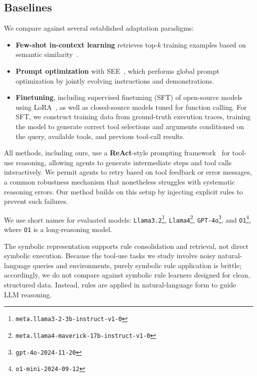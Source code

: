 \subsection{Baselines}


We compare \shortname against several established adaptation paradigms:
\begin{itemize}
    \item \textbf{Few-shot in-context learning} retrieves top-$k$ training examples based on
    semantic similarity~\citep{yizhe2021fewshot}.
    \item \textbf{Prompt optimization} with SEE~\citep{cui2025see}, which performs global prompt
    optimization by jointly evolving instructions and demonstrations.
    \item \textbf{Finetuning}, including supervised finetuning (SFT) of open-source models using
    LoRA~\citep{hu2021lora}, as well as closed-source models tuned for function calling.
    For SFT, we construct training data from ground-truth execution traces, training the model
    to generate correct tool selections and arguments conditioned on the query, available tools,
    and previous tool-call results.
\end{itemize}


All methods, including ours, use a \textbf{ReAct}-style prompting framework~\citep{yao2023react} for tool-use
reasoning, allowing agents to generate intermediate steps and tool calls interactively.
We permit agents to retry based on tool feedback or error messages, a common robustness
mechanism that nonetheless struggles with systematic reasoning errors. Our method builds
on this setup by injecting explicit rules to prevent such failures.

We use short names for evaluated models: \texttt{Llama3.2}\footnote{\texttt{meta.llama3-2-3b-instruct-v1-0}},
\texttt{Llama4}\footnote{\texttt{meta.llama4-maverick-17b-instruct-v1-0}},
\texttt{GPT-4o}\footnote{\texttt{gpt-4o-2024-11-20}}, and \texttt{O1}\footnote{\texttt{o1-mini-2024-09-12}},
where \texttt{O1} is a long-reasoning model.

The symbolic representation supports rule consolidation and retrieval, not
direct symbolic execution. Because the tool-use tasks we study involve noisy natural-language
queries and environments, purely symbolic rule application is brittle; accordingly, we do not
compare against symbolic rule learners designed for clean, structured data\citep{quinlan1990foil, clark1989cn2, Cohen95, Furnkranz97Pruning}. Instead, rules are applied in natural-language form
to guide LLM reasoning.
